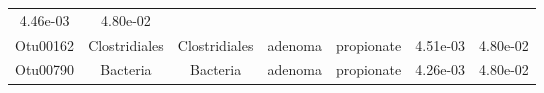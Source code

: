 \documentclass[11pt,]{article}
\begin{document}
\begin{longtable}[]{@{}ccccccc@{}}
\begin{minipage}[t]{0.09\columnwidth}
4.46e-03\strut
\end{minipage} & \begin{minipage}[t]{0.09\columnwidth}\centering\strut
4.80e-02\strut
\end{minipage}\tabularnewline
\begin{minipage}[t]{0.09\columnwidth}\centering\strut
Otu00162\strut
\end{minipage} & \begin{minipage}[t]{0.17\columnwidth}\centering\strut
Clostridiales\strut
\end{minipage} & \begin{minipage}[t]{0.17\columnwidth}\centering\strut
Clostridiales\strut
\end{minipage} & \begin{minipage}[t]{0.09\columnwidth}\centering\strut
adenoma\strut
\end{minipage} & \begin{minipage}[t]{0.11\columnwidth}\centering\strut
propionate\strut
\end{minipage} & \begin{minipage}[t]{0.09\columnwidth}\centering\strut
4.51e-03\strut
\end{minipage} & \begin{minipage}[t]{0.09\columnwidth}\centering\strut
4.80e-02\strut
\end{minipage}\tabularnewline
\begin{minipage}[t]{0.09\columnwidth}\centering\strut
Otu00790\strut
\end{minipage} & \begin{minipage}[t]{0.17\columnwidth}\centering\strut
Bacteria\strut
\end{minipage} & \begin{minipage}[t]{0.17\columnwidth}\centering\strut
Bacteria\strut
\end{minipage} & \begin{minipage}[t]{0.09\columnwidth}\centering\strut
adenoma\strut
\end{minipage} & \begin{minipage}[t]{0.11\columnwidth}\centering\strut
propionate\strut
\end{minipage} & \begin{minipage}[t]{0.09\columnwidth}\centering\strut
4.26e-03\strut
\end{minipage} & \begin{minipage}[t]{0.09\columnwidth}\centering\strut
4.80e-02\strut
\end{minipage}\tabularnewline

\end{longtable}
\end{document}
